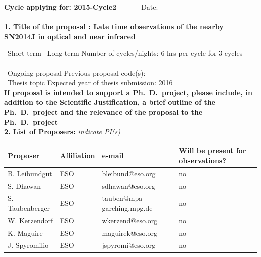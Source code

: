 \documentclass[11pt]{article}
\begin{document}


{\bf Cycle applying for: 2015-Cycle2}~~~~~~~\hfil Date: \hfil\\
%
%
\\
{\bf 1. Title of the proposal : Late time observations of the nearby SN2014J in optical  and near infrared} 

%
\NO~Short term \hfil \YES~Long term \hfil Number of cycles/nights: 6 hrs per cycle for 3 cycles ~~~~\hfil\\
\NO~Ongoing proposal \hfil Previous proposal code(s):~~~~~~~~~~~~~\hfil~~~~\\
\YES~Thesis topic \hfil Expected year of thesis submission: 2016  \hfil~~~\\
{\bf \small {If proposal is intended to support a Ph.\ D.\ project, please
include, in addition to the Scientific Justification, a brief outline of the 
Ph.\ D.\ project and the relevance of the proposal to the Ph.\ D.\ project}}\\

%
%
{\bf 2. List of Proposers: } {\sl indicate PI(s)}\\[1mm]
\begin{tabular}{|p{2in}|p{2in}|p{1.5in}|p{0.8in}|}
\hline
Proposer & Affiliation & e-mail & Will be present for observations?\\
\hline
 B. Leibundgut & ESO &bleibund@eso.org & no\\ \hline
 S. Dhawan& ESO & sdhawan@eso.org& no\\ \hline
S. Taubenberger & ESO & tauben@mpa-garching.mpg.de & no\\ \hline
W. Kerzendorf & ESO & wkerzend@eso.org & no\\ \hline
K. Maguire & ESO & maguirek@eso.org & no\\ \hline
J. Spyromilio & ESO & jspyromi@eso.org & no\\ \hline
\end{tabular}
\end{document}

